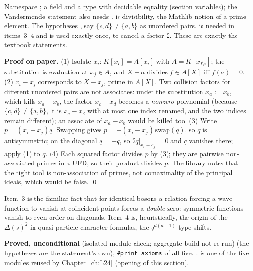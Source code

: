 \begin{dictionary}
Namespace ;  a field and  a type with decidable equality (section variables); the
Vandermonde statement also needs \lean{[Fintype I] [LinearOrder I]}.  is divisibility,  the Mathlib notion of
a prime element. The hypotheses ,  say $\{c,d\}\ne\{a,b\}$ as unordered pairs. \lean{[CharZero K]} is
needed in items~3--4 and is used exactly once, to cancel a factor $2$. These are exactly the textbook statements.
\end{dictionary}

\textbf{Proof on paper.} (1) Isolate $x_i$: $K[x_I]=A[x_i]$ with $A=K[x_{I\setminus i}]$; the substitution is evaluation at
$x_j\in A$, and $X-a$ divides $f\in A[X]$ iff $f(a)=0$. (2) $x_i-x_j$ corresponds to $X-x_j$, prime in $A[X]$. Two collision factors for
different unordered pairs are not associates: under the substitution $x_a:=x_b$, which kills $x_a-x_b$, the factor $x_c-x_d$ becomes
a \emph{nonzero} polynomial (because $\{c,d\}\ne\{a,b\}$, it is $x_c-x_d$ with at most one index renamed, and the two indices remain
different); an associate of $x_a-x_b$ would be killed too. (3) Write $p=(x_i-x_j)q$. Swapping gives
$p=-(x_i-x_j)\,\mathrm{swap}(q)$, so $q$ is antisymmetric; on the diagonal $q=-q$, so $2q|_{x_i=x_j}=0$ and $q$ vanishes there; apply (1)
to $q$. (4) Each squared factor divides $p$ by (3); they are pairwise non-associated primes in a UFD, so their product divides $p$.
The library notes that the right tool is non-association of primes, not comaximality of the principal ideals, which would be false. \qed

\begin{physics}
Item~3 is the familiar fact that for identical bosons a relation forcing a wave function to vanish at coincident points forces a
\emph{double} zero: symmetric functions vanish to even order on diagonals. Item~4 is, heuristically, the origin of the $\Delta(s)^2$ in
quasi-particle character formulas, the $q^{d(d-1)}$-type shifts.
\end{physics}

\begin{status}
\textbf{Proved, unconditional} (isolated-module check; aggregate build not re-run) (the hypotheses are the statement's own); \texttt{\#print axioms} of all five:
.  is one of the five modules reused by
Chapter~\ref{ch:L24} (opening of this section).
\end{status}

